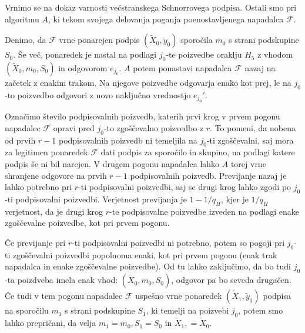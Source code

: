 \documentclass[isrm2, tisk]{fmfdelo}
\begin{document}
Vrnimo se na dokaz varnosti večstranskega Schnorrovega podpisa. Ostali smo pri algoritmu $A$, ki
tekom svojega delovanja poganja poenostavljenega napadalca $\mathcal{F}$. 

Denimo, da $\mathcal{F}$ vrne ponarejen podpis $(\tilde{X}_0, \tilde{y}_0)$ sporočila $m_0$ s strani 
podskupine $S_0$. Še več, ponaredek je nastal na podlagi $j_0$-te poizvedbe oraklju $H_5$ z vhodom 
$(\tilde{X}_0, m_0, S_0)$ in odgovorom $e_{j_0}$. $A$ potem ponastavi napadalca $\mathcal{F}$ nazaj
na začetek z enakim trakom. Na njegove poizvedbe odgovarja enako kot prej, le na $j_0$-to poizvedbo
odgovori z novo naključno vrednostjo $e_{j_0}'$.

Označimo število podpisovalnih poizvedb, katerih prvi krog v prvem pogonu napadalec $\mathcal{F}$ 
opravi pred $j_0$-to zgoščevalno poizvedbo z $r$. To pomeni, da nobena od prvih $r - 1$ podpisovalnih 
poizvedb ni temeljila na $j_0$-ti zgoščevalni, saj mora za legitimen ponaredek $\mathcal{F}$ dati 
podpis za sporočilo in skupino, na podlagi katere podpis še ni bil narejen. V drugem pogonu napadalca
lahko $A$ torej vrne shranjene odgovore na prvih $r - 1$ podpisovalnih poizvedb. Previjanje nazaj 
je lahko potrebno pri $r$-ti podpisovalni poizvedbi, saj se drugi krog lahko zgodi po $j_0$-ti
podpisovalni poizvedbi. Verjetnost previjanja je $1 - 1/q_H$, kjer je $1/q_H$ verjetnost, da je
drugi krog $r$-te podpisovalne poizvedbe izveden na podlagi enake zgoščevalne poizvedbe, kot pri
prvem pogonu.

Če previjanje pri $r$-ti podpisovalni poizvedbi ni potrebno, potem so pogoji pri $j_0$-ti zgoščevalni
poizvedbi popolnoma enaki, kot pri prvem pogonu (enak trak napadalca in enake zgoščevalne poizvedbe).
Od tu lahko zaključimo, da bo tudi $j_0$-ta poizdveba imela enak vhod: $(\tilde{X}_0, m_0, S_0)$, 
odgovor pa bo seveda drugačen. Če tudi v tem pogonu napadalec $\mathcal{F}$ uspešno vrne ponaredek
$(\tilde{X}_1, \tilde{y}_1)$ podpisa na sporočilu $m_1$ s strani podskupine $S_1$, ki temelji na 
poizvebi $j_0$, potem smo lahko prepričani, da velja $m_1 = m_0, S_1 = S_0$ in $\tilde{X}_1, = \tilde{X}_0$.
\end{document}
